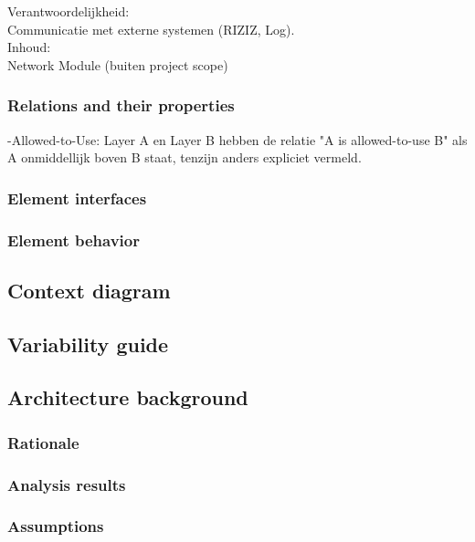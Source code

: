 \documentclass[a4paper,10pt]{article}
\begin{document}
Verantwoordelijkheid:\\
Communicatie met externe systemen (RIZIZ, Log).\\

Inhoud:\\
Network Module (buiten project scope)\\




\subsubsection{Relations and their properties}

-Allowed-to-Use: Layer A en Layer B hebben de relatie "A is allowed-to-use B" als A onmiddellijk boven B staat, tenzijn anders expliciet vermeld.\\

\subsubsection{Element interfaces}

\subsubsection{Element behavior}

\subsection{Context diagram}

\subsection{Variability guide}

\subsection{Architecture background}

\subsubsection{Rationale}

\subsubsection{Analysis results}

\subsubsection{Assumptions}
\end{document}
